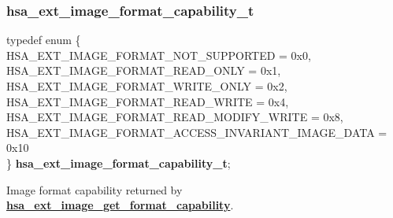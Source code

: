 \documentclass[final,oneside]{book}
\newcommand{\reffun}[1]{\textbf{#1}}
\newcommand{\reftyp}[1]{#1}
\newcommand{\refenu}[1]{\reftyp{#1}}
\newenvironment{mylongtable}{\rowcolors{0}{lightgray}{lightgray}\longtable} {
\endlongtable}
\begin{document}
\subsubsection{hsa_\-ext_\-image_\-format_\-capability_\-t}
\vspace{-5.5mm}\begin{mylongtable}{@{}p{\textwidth}}
\rule{0pt}{3ex}typedef enum \{\\\hspace{1.7em}\hypertarget{group__ext-images_1ggaef83852ae5fb54b82317e96990da388aaae6fb99314cf823319737bd5b622a2f4}{\refenu{HSA_\-EXT_\-IMAGE_\-FORMAT_\-NOT_\-SUPPORTED}} = 0x0,\\
\hspace{1.7em}\hypertarget{group__ext-images_1ggaef83852ae5fb54b82317e96990da388aa3db3e90538f1fd5a45d7937f9c881b2a}{\refenu{HSA_\-EXT_\-IMAGE_\-FORMAT_\-READ_\-ONLY}} = 0x1,\\
\hspace{1.7em}\hypertarget{group__ext-images_1ggaef83852ae5fb54b82317e96990da388aa489215daa4de11d09f2d3c1c8c212fcb}{\refenu{HSA_\-EXT_\-IMAGE_\-FORMAT_\-WRITE_\-ONLY}} = 0x2,\\
\hspace{1.7em}\hypertarget{group__ext-images_1ggaef83852ae5fb54b82317e96990da388aaf88802f6e05d969561eccbb0a3f39222}{\refenu{HSA_\-EXT_\-IMAGE_\-FORMAT_\-READ_\-WRITE}} = 0x4,\\
\hspace{1.7em}\hypertarget{group__ext-images_1ggaef83852ae5fb54b82317e96990da388aa852e4523bdab4f798240af94cc06aa65}{\refenu{HSA_\-EXT_\-IMAGE_\-FORMAT_\-READ_\-MODIFY_\-WRITE}} = 0x8,\\
\hspace{1.7em}\hypertarget{group__ext-images_1ggaef83852ae5fb54b82317e96990da388aa286344b2349f73e9f92400f589a05f60}{\refenu{HSA_\-EXT_\-IMAGE_\-FORMAT_\-ACCESS_\-INVARIANT_\-IMAGE_\-DATA}} = 0x10\\
\} \hypertarget{group__ext-images_1gaef83852ae5fb54b82317e96990da388a}{\textbf{hsa_\-ext_\-image_\-format_\-capability_\-t}};\rule[-2ex]{0pt}{0pt}\end{mylongtable}
\vspace{-5mm}Image format capability returned by \hyperlink{group__ext-images_1ga7911f56b1bc354c47fde409ace04590c}{\reffun{hsa_\-ext_\-image_\-get_\-format_\-capability}}.
\end{document}
